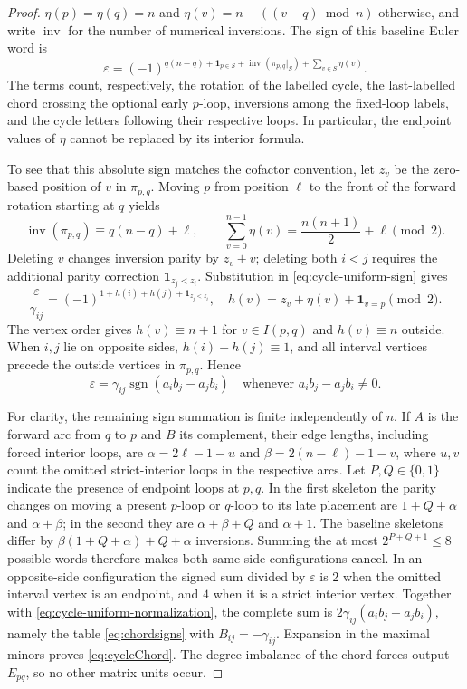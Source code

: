 \begin{proof}
$\eta(p)=\eta(q)=n$ and
$\eta(v)=n-((v-q)\bmod n)$ otherwise, and write
$\operatorname{inv}$ for the number of numerical inversions.
The sign of this baseline Euler word is
\begin{equation}\label{eq:cycle-uniform-sign}
 \varepsilon=(-1)^{q(n-q)+\mathbf1_{p\in S}
       +\operatorname{inv}(\pi_{p,q}|_S)
       +\sum_{v\in S}\eta(v)}.
\end{equation}
The terms count, respectively, the rotation of the labelled cycle,
the last-labelled chord crossing the optional early $p$-loop,
inversions among the fixed-loop labels, and the cycle letters
following their respective loops. In particular, the endpoint
values of $\eta$ cannot be replaced by its interior formula.

To see that this absolute sign matches the cofactor convention, let
$z_v$ be the zero-based position of $v$ in $\pi_{p,q}$.
Moving $p$ from position $\ell$ to the front of the forward
rotation starting at $q$ yields
\[
 \operatorname{inv}(\pi_{p,q})\equiv q(n-q)+\ell,
 \qquad \sum_{v=0}^{n-1}\eta(v)=\frac{n(n+1)}2+\ell
 \pmod2.
\]
Deleting $v$ changes inversion parity by $z_v+v$; deleting both
$i<j$ requires the additional parity correction
$\mathbf1_{z_j<z_i}$. Substitution in
\eqref{eq:cycle-uniform-sign} gives
\[
 \frac{\varepsilon}{\gamma_{ij}}=
 (-1)^{1+h(i)+h(j)+\mathbf1_{z_j<z_i}},
 \quad h(v)=z_v+\eta(v)+\mathbf1_{v=p}\pmod2.
\]
The vertex order gives $h(v)\equiv n+1$ for $v\in I(p,q)$ and
$h(v)\equiv n$ outside. When $i,j$ lie on opposite sides,
$h(i)+h(j)\equiv1$, and all interval vertices precede the
outside vertices in $\pi_{p,q}$. Hence
\begin{equation}\label{eq:cycle-uniform-normalization}
 \varepsilon=\gamma_{ij}\operatorname{sgn}(a_i b_j-a_j b_i)
 \quad\text{whenever }a_i b_j-a_j b_i\ne0.
\end{equation}

For clarity, the remaining sign summation is finite independently
of $n$. If $A$ is the forward arc from $q$ to $p$ and $B$ its
complement, their edge lengths, including forced interior loops,
are $\alpha=2\ell-1-u$ and $\beta=2(n-\ell)-1-v$,
where $u,v$ count the omitted strict-interior loops in the
respective arcs. Let $P,Q\in\{0,1\}$ indicate the presence of
endpoint loops at $p,q$. In the first skeleton the parity changes
on moving a present $p$-loop or $q$-loop to its late placement
are $1+Q+\alpha$ and $\alpha+\beta$; in the second they are
$\alpha+\beta+Q$ and $\alpha+1$. The baseline skeletons differ
by $\beta(1+Q+\alpha)+Q+\alpha$ inversions.
Summing the at most $2^{P+Q+1}\le8$ possible words therefore
makes both same-side configurations cancel. In an opposite-side
configuration the signed sum divided by $\varepsilon$ is $2$
when the omitted interval vertex is an endpoint, and $4$
when it is a strict interior vertex. Together with
\eqref{eq:cycle-uniform-normalization}, the complete sum is
$2\gamma_{ij}(a_i b_j-a_j b_i)$, namely the table
\eqref{eq:chordsigns} with $B_{ij}=-\gamma_{ij}$.
Expansion in the maximal minors proves \eqref{eq:cycleChord}.
The degree imbalance of the chord forces output $E_{pq}$,
so no other matrix units occur.


\end{proof}
